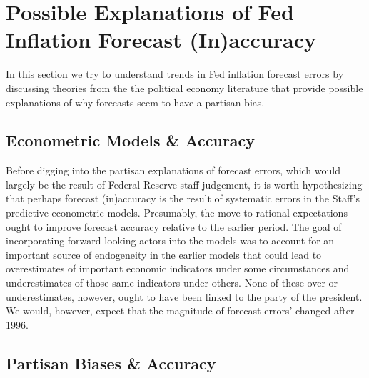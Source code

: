 \documentclass[a4paper]{article}\usepackage{graphicx, color}
\begin{document}
\section{Possible Explanations of Fed Inflation Forecast (In)accuracy}

In this section we try to understand trends in Fed inflation forecast errors by discussing theories from the the political economy literature that provide possible explanations of why forecasts seem to have a partisan bias. 

\subsection{Econometric Models \& Accuracy}

Before digging into the partisan explanations of forecast errors, which would largely be the result of Federal Reserve staff judgement, it is worth hypothesizing that perhaps forecast (in)accuracy is the result of systematic errors in the Staff's predictive econometric models. Presumably, the move to rational expectations ought to improve forecast accuracy relative to the earlier period. The goal of incorporating forward looking actors into the models was to account for an important source of endogeneity in the earlier models that could lead to overestimates of important economic indicators under some circumstances and underestimates of those same indicators under others. None of these over or underestimates, however, ought to have been linked to the party of the president. We would, however, expect that the magnitude of forecast errors' changed after 1996.



\subsection{Partisan Biases \& Accuracy}
\end{document}

